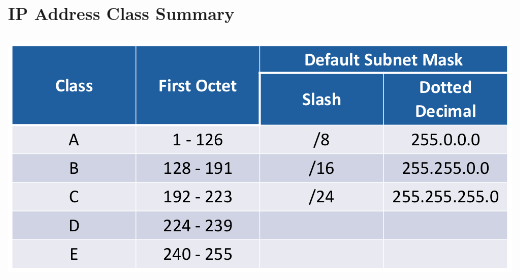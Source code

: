 \documentclass[pdflatex,compress]{beamer}
\begin{document}
\begin{frame}
	\frametitle{IP Address Class Summary}
	\begin{center}
		\includegraphics[width=1\linewidth]{img/img11}
	\end{center}
\end{frame}
\end{document}
